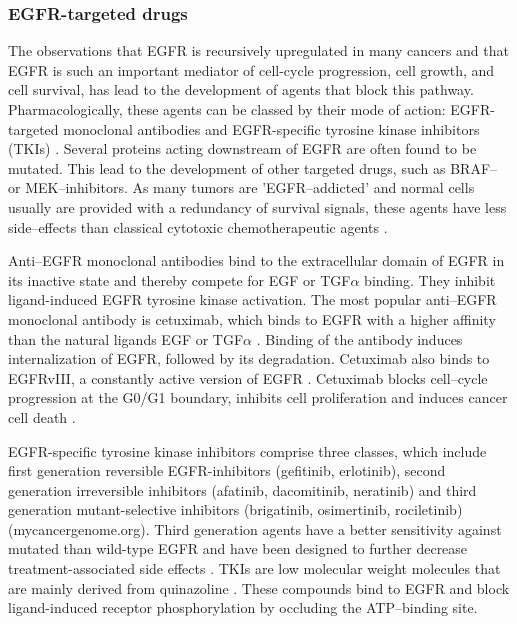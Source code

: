{{{    \subsubsection{EGFR-targeted drugs}

      The observations that EGFR is recursively upregulated in many cancers and
      that EGFR is such an important mediator of cell-cycle progression,  cell
      growth, and cell survival, has lead to the development of agents that
      block this pathway. Pharmacologically, these agents can be classed by
      their mode of action: EGFR-targeted monoclonal antibodies and
      EGFR-specific tyrosine kinase inhibitors (TKIs) {\cite{targeting}}. Several proteins acting
      downstream of EGFR are often found to be mutated. This lead to the
      development of other targeted drugs, such as BRAF-- or MEK--inhibitors.
      As many tumors are 'EGFR--addicted' and normal cells usually are provided
      with a redundancy of survival signals, these agents have less
      side--effects than classical cytotoxic chemotherapeutic agents {\cite{targeting}}.

      Anti--EGFR monoclonal antibodies bind to the extracellular domain of
      EGFR in its inactive state and thereby compete for EGF or TGF$\alpha$
      binding. They inhibit ligand-induced EGFR tyrosine kinase activation. The
      most popular anti--EGFR monoclonal antibody is cetuximab, which binds to
      EGFR with a higher affinity than the natural ligands EGF or TGF$\alpha$ {\cite{cetuxi}}.
      Binding of the antibody induces internalization of EGFR, followed by its
      degradation. Cetuximab also binds to EGFRvIII, a constantly active
      version of EGFR {\cite{cetuxi_2}}. Cetuximab blocks cell--cycle  progression at the G0/G1
      boundary, inhibits cell proliferation and induces cancer cell death {\cite{cetuxi_3}}.

      EGFR-specific tyrosine kinase inhibitors comprise three classes, which
      include first generation reversible  EGFR-inhibitors (gefitinib,
      erlotinib), second generation irreversible inhibitors (afatinib,
      dacomitinib, neratinib) and third generation mutant-selective inhibitors
      (brigatinib, osimertinib, rociletinib) (mycancergenome.org). Third generation agents have a
      better sensitivity against mutated than wild-type EGFR and have been
      designed to further decrease treatment-associated side effects {\cite{tki}}. TKIs are
      low molecular weight molecules that are mainly derived from quinazoline {\cite{tki_2}}.
      These compounds bind to EGFR and block ligand-induced receptor
      phosphorylation by occluding the ATP--binding site.

}}}
